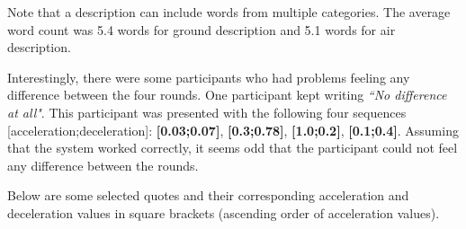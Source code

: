 Note that a description can include words from multiple categories. The average word count was 5.4 words for ground description and 5.1 words for air description.

Interestingly, there were some participants who had problems feeling any difference between the four rounds. One participant kept writing \textit{``No difference at all"}. This participant was presented with the following four sequences [acceleration;deceleration]: \textbf{[0.03;0.07]}, \textbf{[0.3;0.78]}, \textbf{[1.0;0.2]}, \textbf{[0.1;0.4]}. Assuming that the system worked correctly, it seems odd that the participant could not feel any difference between the rounds.

Below are some selected quotes and their corresponding acceleration and deceleration values in square brackets (ascending order of acceleration values).
